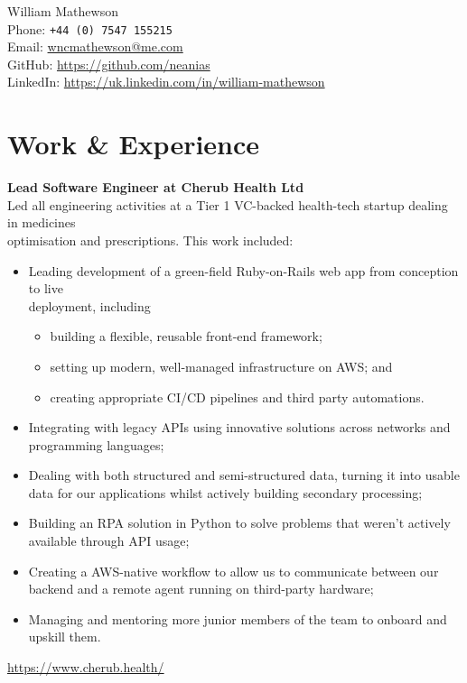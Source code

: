 \documentclass[10pt, a4paper]{article}
\newcommand{\years}[1]{\marginnote{\scriptsize #1}}
\begin{document}
{\LARGE William Mathewson}\\%

Phone: \texttt{+44 (0) 7547 155215}\\
Email: \href{mailto:wncmathewson@me.com}{wncmathewson@me.com}\\
GitHub: \url{https://github.com/neanias}\\
LinkedIn:
\url{https://uk.linkedin.com/in/william-mathewson}

\section*{Work \& Experience}
\noindent

\years{Mar 2023 --\\ Present} \textbf{Lead Software Engineer at Cherub
Health Ltd}\\
Led all engineering activities at a Tier 1 VC-backed health-tech startup dealing
in medicines\\ optimisation and prescriptions. This work included:
\begin{itemize}[noitemsep]
  \item Leading development of a green-field Ruby-on-Rails web app from
    conception to live\\ deployment, including
    \begin{itemize}[noitemsep]
      \item building a flexible, reusable front-end framework;
      \item setting up modern, well-managed infrastructure on AWS; and
      \item creating appropriate CI/CD pipelines and third party automations.
    \end{itemize}

  \item Integrating with legacy APIs using innovative solutions across networks
    and programming languages;
  \item Dealing with both structured and semi-structured data, turning it into
    usable data for our applications whilst actively building secondary
    processing;
  \item Building an RPA solution in Python to solve problems that weren't
    actively available through API usage;
  \item Creating a AWS-native workflow to allow us to communicate between our
    backend and a remote agent running on third-party hardware;
  \item Managing and mentoring more junior members of the team to onboard and
    upskill them.
\end{itemize}
\url{https://www.cherub.health/}\\
\end{document}
